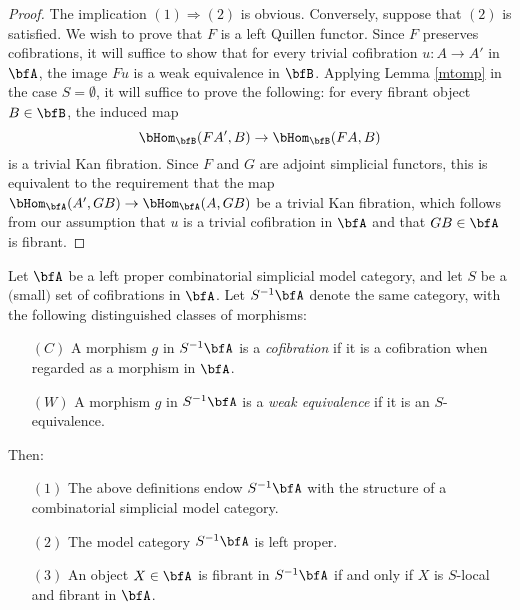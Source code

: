 \begin{Simplicial Categories}
\begin{proof}
The implication $(1) \Rightarrow (2)$ is obvious. Conversely, suppose that $(2)$ is satisfied.
We wish to prove that $F$ is a left Quillen functor. Since $F$ preserves cofibrations, it will suffice
to show that for every trivial cofibration $u: A \rightarrow A'$ in $\bfA$, the image
$Fu$ is a weak equivalence in $\bfB$. Applying Lemma \ref{mtomp} in the case
$S = \emptyset$, it will suffice to prove the following: for every fibrant object $B \in \bfB$, the
induced map
$$ \bHom_{ \bfB}( FA', B) \rightarrow \bHom_{\bfB}( FA, B)$$
is a trivial Kan fibration. Since $F$ and $G$ are adjoint simplicial functors, this is equivalent
to the requirement that the map $\bHom_{\bfA}( A', GB) \rightarrow \bHom_{\bfA}(A, GB)$ be
a trivial Kan fibration, which follows from our assumption that $u$ is a trivial cofibration in
$\bfA$ and that $GB \in \bfA$ is fibrant.
\end{proof}

\begin{proposition}\label{suritu}
Let $\bfA$ be a left proper combinatorial simplicial model category, and let $S$ be a $($small$)$ set of cofibrations in $\bfA$. 
Let $S^{-1} \bfA$ denote the same category, with the following distinguished classes of morphisms:
\begin{itemize}
\item[$(C)$] A morphism $g$ in $S^{-1} \bfA$ is a {\it cofibration} if it is a cofibration when regarded as a morphism in $\bfA$.
\item[$(W)$] A morphism $g$ in $S^{-1} \bfA$ is a {\it weak equivalence} if it is an $S$-equivalence.
\end{itemize}
Then:
\begin{itemize}
\item[$(1)$] The above definitions endow $S^{-1} \bfA$ with the structure of a combinatorial simplicial model category.
\item[$(2)$] The model category $S^{-1} \bfA$ is left proper.
\item[$(3)$] An object $X \in \bfA$ is fibrant in $S^{-1} \bfA$ if and only if $X$ is $S$-local and fibrant in $\bfA$.
\end{itemize}
\end{proposition}


\end{Simplicial Categories}
